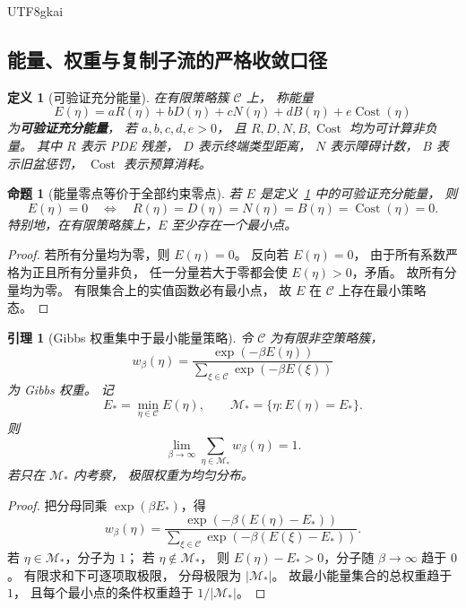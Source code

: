 \documentclass[12pt]{article}
\newtheorem{definition}{定义}[section]
\newtheorem{proposition}{命题}[section]
\newtheorem{lemma}{引理}[section]
\newcommand{\Cost}{\operatorname{Cost}}
\begin{document}
\begin{CJK*}{UTF8}{gkai}
\subsection{能量、权重与复制子流的严格收敛口径}
\label{subsec:tex53-energy-weight-closure}

\begin{definition}[可验证充分能量]
\label{def:tex53-sufficient-energy}
在有限策略簇 \(\mathcal C\) 上，
称能量
\[
  E(\eta)
  =
  aR(\eta)+bD(\eta)+cN(\eta)+dB(\eta)+e\Cost(\eta)
\]
为\textbf{可验证充分能量}，
若 \(a,b,c,d,e>0\)，
且 \(R,D,N,B,\Cost\) 均为可计算非负量。
其中 \(R\) 表示 PDE 残差，
\(D\) 表示终端类型距离，
\(N\) 表示障碍计数，
\(B\) 表示旧盆惩罚，
\(\Cost\) 表示预算消耗。
\end{definition}

\begin{proposition}[能量零点等价于全部约束零点]
\label{prop:tex53-energy-zero-equivalence}
若 \(E\) 是定义~\ref{def:tex53-sufficient-energy} 中的可验证充分能量，
则
\[
  E(\eta)=0
  \quad\Longleftrightarrow\quad
  R(\eta)=D(\eta)=N(\eta)=B(\eta)=\Cost(\eta)=0.
\]
特别地，在有限策略簇上，\(E\) 至少存在一个最小点。
\end{proposition}

\begin{proof}
若所有分量均为零，则 \(E(\eta)=0\)。
反向若 \(E(\eta)=0\)，
由于所有系数严格为正且所有分量非负，
任一分量若大于零都会使 \(E(\eta)>0\)，矛盾。
故所有分量均为零。
有限集合上的实值函数必有最小点，
故 \(E\) 在 \(\mathcal C\) 上存在最小策略态。
\end{proof}

\begin{lemma}[Gibbs 权重集中于最小能量策略]
\label{lem:tex53-gibbs-concentration}
令 \(\mathcal C\) 为有限非空策略簇，
\[
  w_\beta(\eta)
  =
  \frac{\exp(-\beta E(\eta))}
       {\sum_{\xi\in\mathcal C}\exp(-\beta E(\xi))}
\]
为 Gibbs 权重。
记
\[
  E_\ast=\min_{\eta\in\mathcal C}E(\eta),
  \qquad
  \mathcal M_\ast=\{\eta:E(\eta)=E_\ast\}.
\]
则
\[
  \lim_{\beta\to\infty}
  \sum_{\eta\in\mathcal M_\ast}w_\beta(\eta)
  =
  1.
\]
若只在 \(\mathcal M_\ast\) 内考察，
极限权重为均匀分布。
\end{lemma}

\begin{proof}
把分母同乘 \(\exp(\beta E_\ast)\)，得
\[
  w_\beta(\eta)
  =
  \frac{\exp(-\beta(E(\eta)-E_\ast))}
       {\sum_{\xi\in\mathcal C}\exp(-\beta(E(\xi)-E_\ast))}.
\]
若 \(\eta\in\mathcal M_\ast\)，分子为 \(1\)；
若 \(\eta\notin\mathcal M_\ast\)，
则 \(E(\eta)-E_\ast>0\)，分子随 \(\beta\to\infty\) 趋于 \(0\)。
有限求和下可逐项取极限，
分母极限为 \(|\mathcal M_\ast|\)。
故最小能量集合的总权重趋于 \(1\)，
且每个最小点的条件权重趋于 \(1/|\mathcal M_\ast|\)。
\end{proof}


\end{CJK*}
\end{document}
